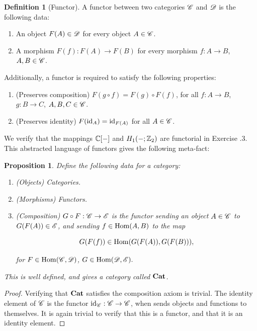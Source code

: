 \documentclass{article}
\newtheorem{proposition}{Proposition}[section]
\theoremstyle{definition}
\newtheorem*{definition}{Definition}
\numberwithin{figure}{section}
\begin{document}
\begin{definition}[Functor] A functor between two categories $\mathscr{C}$ and $\mathscr{D}$ is the following data:

\begin{enumerate}
\item An object $F(A)\in\mathscr{D}$ for every object $A\in \mathscr{C}$.
\item A morphism $F(f):F(A)\to F(B)$ for every morphism $f:A\to B$, $A,B\in \mathscr{C}$.
\end{enumerate}

Additionally, a functor is required to satisfy the following properties:

\begin{enumerate}
\item (Preserves composition) $F(g\circ f)=F(g)\circ F(f)$, for all $f:A\to B$, $g:B\to C$, $A,B,C\in \mathscr{C}$.
\item (Preserves identity) $F(\mathrm{id}_{A})=\mathrm{id}_{F(A)}$ for all $A\in \mathscr{C}$.
\end{enumerate}

\raggedleft\qedsymbol{}
\end{definition}

We verify that the mappings $\mathbb{C}[\--]$ and $H_1(\--;\mathbb{Z}_2)$ are functorial in Exercise \thesection.3. This abstracted language of functors gives the following meta-fact:

\begin{proposition} Define the following data for a category:

\begin{enumerate}
\item (Objects) Categories.
\item (Morphisms) Functors.
\item (Composition) $G\circ F: \mathscr{C} \to \mathscr{E}$ is the functor sending an object $A\in \mathscr{C}$ to $G(F(A))\in \mathscr{E}$, and sending $f\in \mathrm{Hom}(A,B)$ to the map

$$G(F(f))\in \mathrm{Hom}(G(F(A)),G(F(B))),$$

for $F\in \mathrm{Hom}(\mathscr{C},\mathscr{D})$, $G\in \mathrm{Hom}(\mathscr{D},\mathscr{E}).$ 
\end{enumerate}

This is well defined, and gives a category called $\bold{Cat}$.
\end{proposition}
\begin{proof} Verifying that $\bold{Cat}$ satisfies the composition axiom is trivial. The identity element of $\mathscr{C}$ is the functor $\mathrm{id}_{\mathscr{C}}:\mathscr{C}\to \mathscr{C}$, when sends objects and functions to themselves. It is again trivial to verify that this is a functor, and that it is an identity element.
\end{proof}
\end{document}

